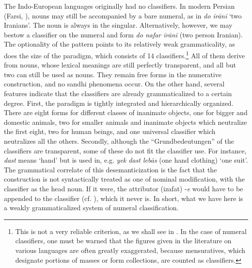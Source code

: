 The Indo-European languages originally had no classifiers. In modern Persian (Farsi, \citealt{Moinfar1980}), nouns may still be accompanied by a bare numeral, as in \textit{do \=ir\=an\=i} `two Iranians'. The noun is always in the singular. Alternatively, however, we may bestow a classifier on the numeral and form \textit{do nafar \=ir\=an\=i} (two person Iranian). The optionality of the pattern points to its relatively weak grammaticality, as does the size of the paradigm, which consists of 14 classifiers.\footnote{This is not a very reliable criterion, as we shall see in . In the case of numeral classifiers, one must be warned that the figures given in the literature on various languages are often greatly exaggerated, because mensuratives, which designate portions of masses or form collections, are counted as classifiers.} All of them derive from nouns, whose lexical meanings are still perfectly transparent, and all but two can still be used as nouns. They remain free forms in the numerative construction, and no sandhi phenomena occur. On the other hand, several features indicate that the classifiers are already grammaticalized to a certain degree. First, the paradigm is tightly integrated and hierarchically organized. There are eight forms for different classes of inanimate objects, one for bigger and domestic animals, two for smaller animals and inanimate objects which neutralize the first eight, two for human beings, and one universal classifier which neutralizes all the others. Secondly, although the ``Grundbedeutungen'' of the classifiers are transparent, some of these do not fit the classifier use. For instance, \textit{dast} means ‘hand’ but is used in, e.g. \textit{yek dast leb\=as} (one hand clothing) ‘one suit’. The grammatical correlate of this desemanticization is the fact that the construction is not syntactically treated as one of nominal modification, with the classifier as the head noun. If it were, the attributor (izafat) -\textit{e} would have to be appended to the classifier (cf. ), which it never is. In short, what we have here is a weakly grammaticalized system of numeral classification.

